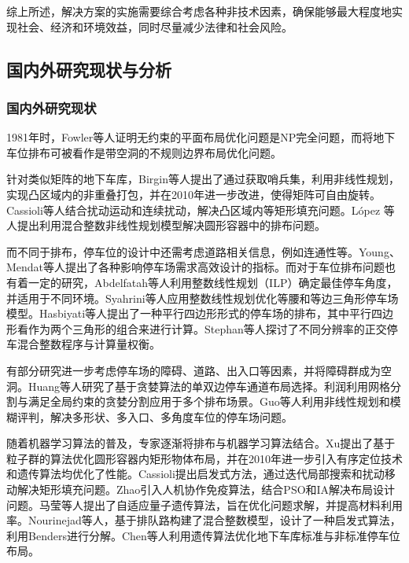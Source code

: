 综上所述，解决方案的实施需要综合考虑各种非技术因素，确保能够最大程度地实现社会、经济和环境效益，同时尽量减少法律和社会风险。
\subsection{国内外研究现状与分析}
\subsubsection{国内外研究现状}
1981年时，Fowler\cite{fowler1981optimal}等人证明无约束的平面布局优化问题是NP完全问题，而将地下车位排布可被看作是带空洞的不规则边界布局优化问题。

针对类似矩阵的地下车库，Birgin\cite{birgin2006method, birgin2006orthogonal}等人提出了通过获取哨兵集，利用非线性规划，实现凸区域内的非重叠打包，并在2010年进一步改进\cite{birgin2010orthogonal}，使得矩阵可自由旋转。Cassioli\cite{cassioli2010heuristic}等人结合扰动运动和连续扰动，解决凸区域内等矩形填充问题。L{\'o}pez \cite{lopez2018packing}等人提出利用混合整数非线性规划模型解决圆形容器中的排布问题。

而不同于排布，停车位的设计中还需考虑道路相关信息，例如连通性等。Young、Mendat\cite{young1988review, mendat2003perceptions}等人提出了各种影响停车场需求高效设计的指标。而对于车位排布问题也有着一定的研究，Abdelfatah\cite{abdelfatah2014parking}等人利用整数线性规划（ILP）确定最佳停车角度，并适用于不同环境。Syahrini\cite{syahrini2018mathematical}等人应用整数线性规划优化等腰和等边三角形停车场模型。Hasbiyati\cite{hasbiyati2019parking}等人提出了一种平行四边形形式的停车场的排布，其中平行四边形看作为两个三角形的组合来进行计算。Stephan\cite{stephan2021layout}等人探讨了不同分辨率的正交停车混合整数程序与计算量权衡。

有部分研究进一步考虑停车场的障碍、道路、出入口等因素，并将障碍群成为空洞。Huang\cite{huang2020general}等人研究了基于贪婪算法的单双边停车通道布局选择。利润\cite{1021546706.nh}利用网格分割与满足全局约束的贪婪分割应用于多个排布场景。Guo\cite{guo2022optimal}等人利用非线性规划和模糊评判，解决多形状、多入口、多角度车位的停车场问题。

随着机器学习算法的普及，专家逐渐将排布与机器学习算法结合。Xu\cite{xu2007particle}提出了基于粒子群的算法优化圆形容器内矩形物体布局，并在2010年\cite{xu2010genetic}进一步引入有序定位技术和遗传算法均优化了性能。Cassioli\cite{cassioli2010heuristic}提出启发式方法，通过迭代局部搜索和扰动移动解决矩形填充问题。Zhao\cite{zhao2014human}引入人机协作免疫算法，结合PSO和IA解决布局设计问题。马莹\cite{JSGG201820015}等人提出了自适应量子遗传算法，旨在优化问题求解，并提高材料利用率。Nourinejad\cite{nourinejad2018designing}等人，基于排队路构建了混合整数模型，设计了一种启发式算法，利用Benders进行分解。Chen\cite{chen2022arrangement}等人利用遗传算法优化地下车库标准与非标准停车位布局。

